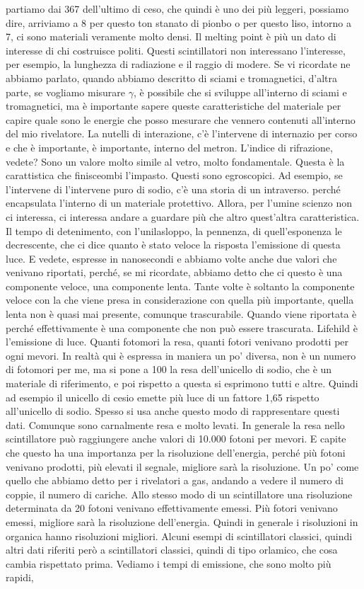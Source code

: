 partiamo dai 367 dell'ultimo di ceso, che quindi è uno dei più leggeri, possiamo dire, arriviamo a 8 per questo ton stanato di pionbo o per questo liso, intorno a 7, ci sono materiali veramente molto densi. Il melting point è più un dato di interesse di chi costruisce politi. Questi scintillatori non interessano l'interesse, per esempio, la lunghezza di radiazione e il raggio di modere. Se vi ricordate ne abbiamo parlato, quando abbiamo descritto di sciami e tromagnetici, d'altra parte, se vogliamo misurare $\gamma$, è possibile che si sviluppe all'interno di sciami e tromagnetici, ma è importante sapere queste caratteristiche del materiale per capire quale sono le energie che posso mesurare che vennero contenuti all'interno del mio rivelatore. La nutelli di interazione, c'è l'intervene di internazio per corso e che è importante, è importante, interno del metron. L'indice di rifrazione, vedete? Sono un valore molto simile al vetro, molto fondamentale. Questa è la carattistica che finisceombi l'impasto. Questi sono egroscopici. Ad esempio, se l'intervene di l'intervene puro di sodio, c'è una storia di un intraverso. perché encapsulata l'interno di un materiale protettivo. Allora, per l'umine scienzo non ci interessa, ci interessa andare a guardare più che altro quest'altra caratteristica. Il tempo di detenimento, con l'unilasloppo, la pennenza, di quell'esponenza le decrescente, che ci dice quanto è stato veloce la risposta l'emissione di questa luce. E vedete, espresse in nanosecondi e abbiamo volte anche due valori che venivano riportati, perché, se mi ricordate, abbiamo detto che ci questo è una componente veloce, una componente lenta. Tante volte è soltanto la componente veloce con la che viene presa in considerazione con quella più importante, quella lenta non è quasi mai presente, comunque trascurabile. Quando viene riportata è perché effettivamente è una componente che non può essere trascurata. Lifehild è l'emissione di luce. Quanti fotomori la resa, quanti fotori venivano prodotti per ogni mevori. In realtà qui è espressa in maniera un po' diversa, non è un numero di fotomori per me, ma si pone a 100 la resa dell'unicello di sodio, che è un materiale di riferimento, e poi rispetto a questa si esprimono tutti e altre. Quindi ad esempio il unicello di cesio emette più luce di un fattore 1,65 rispetto all'unicello di sodio. Spesso si usa anche questo modo di rappresentare questi dati. Comunque sono carnalmente resa e molto levati. In generale la resa nello scintillatore può raggiungere anche valori di 10.000 fotoni per mevori. E capite che questo ha una importanza per la risoluzione dell'energia, perché più fotoni venivano prodotti, più elevati il segnale, migliore sarà la risoluzione. Un po' come quello che abbiamo detto per i rivelatori a gas, andando a vedere il numero di coppie, il numero di cariche. Allo stesso modo di un scintillatore una risoluzione determinata da 20 fotoni venivano effettivamente emessi. Più fotori venivano emessi, migliore sarà la risoluzione dell'energia. Quindi in generale i risoluzioni in organica hanno risoluzioni migliori. Alcuni esempi di scintillatori classici, quindi altri dati riferiti però a scintillatori classici, quindi di tipo orlamico, che cosa cambia rispettato prima. Vediamo i tempi di emissione, che sono molto più rapidi, 